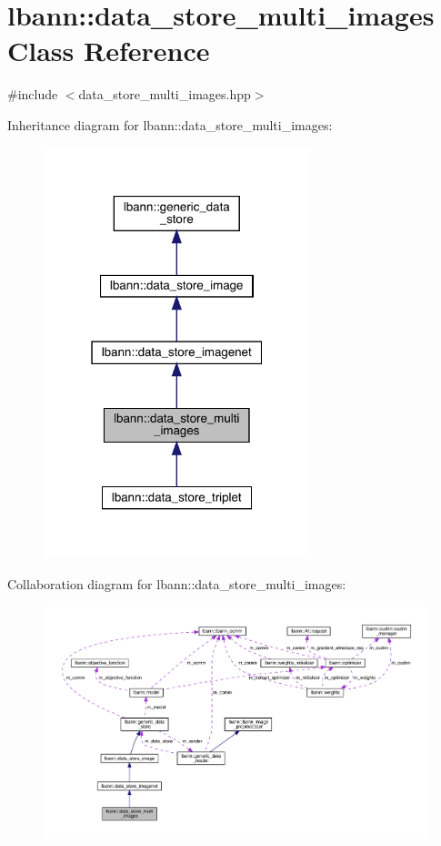 \hypertarget{classlbann_1_1data__store__multi__images}{}\section{lbann\+:\+:data\+\_\+store\+\_\+multi\+\_\+images Class Reference}
\label{classlbann_1_1data__store__multi__images}


{\ttfamily \#include $<$data\+\_\+store\+\_\+multi\+\_\+images.\+hpp$>$}



Inheritance diagram for lbann\+:\+:data\+\_\+store\+\_\+multi\+\_\+images\+:\nopagebreak
\begin{figure}[H]
\begin{center}
\leavevmode
\includegraphics[width=220pt]{classlbann_1_1data__store__multi__images__inherit__graph}
\end{center}
\end{figure}


Collaboration diagram for lbann\+:\+:data\+\_\+store\+\_\+multi\+\_\+images\+:\nopagebreak
\begin{figure}[H]
\begin{center}
\leavevmode
\includegraphics[width=350pt]{classlbann_1_1data__store__multi__images__coll__graph}
\end{center}
\end{figure}
